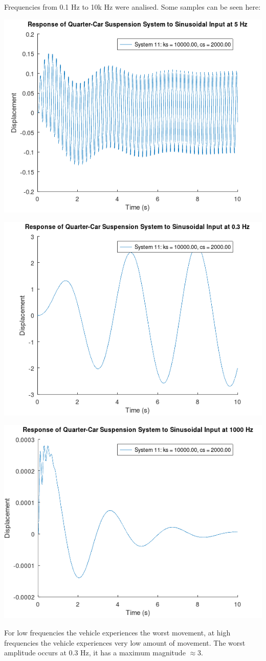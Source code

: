\documentclass[11pt]{article}
\begin{document}
Frequencies from 0.1 Hz to 10k Hz were analised. Some samples can be seen here:
\begin{center}
\includegraphics[width=.9\linewidth]{ENG204-Assignment-2-Sinusoidal-f-5.png}
\end{center}
\begin{center}
\includegraphics[width=.9\linewidth]{ENG204-Assignment-2-Sinusoidal-f-0.3.png}
\end{center}
\begin{center}
\includegraphics[width=.9\linewidth]{ENG204-Assignment-2-Sinusoidal-f-1000.png}
\end{center}
For low frequencies the vehicle experiences the worst movement, at high frequencies the vehicle experiences very low amount of movement. The worst amplitude occurs at 0.3 Hz, it has a maximum magnitude \(\approx 3\).
\end{document}
